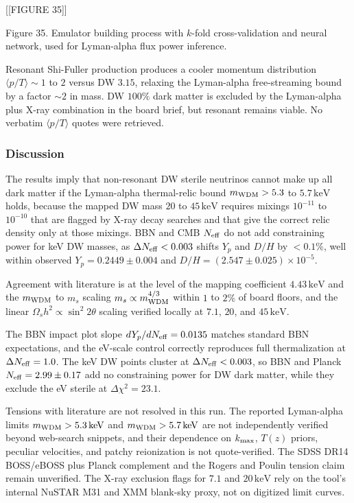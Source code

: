 \documentclass[11pt,a4paper]{article}
\begin{document}
[[FIGURE 35]]

Figure 35. Emulator building process with $k$-fold cross-validation and neural network, used for Lyman-alpha flux power inference.

Resonant Shi-Fuller production produces a cooler momentum distribution $\langle p/T \rangle \sim 1$ to $2$ versus DW $3.15$, relaxing the Lyman-alpha free-streaming bound by a factor $\sim 2$ in mass. DW $100\%$ dark matter is excluded by the Lyman-alpha plus X-ray combination in the board brief, but resonant remains viable. No verbatim $\langle p/T \rangle$ quotes were retrieved.

\subsubsection*{Discussion}
The results imply that non-resonant DW sterile neutrinos cannot make up all dark matter if the Lyman-alpha thermal-relic bound $m_{\rm WDM} > 5.3$ to $5.7\,\mathrm{keV}$ holds, because the mapped DW mass $20$ to $45\,\mathrm{keV}$ requires mixings $10^{-11}$ to $10^{-10}$ that are flagged by X-ray decay searches and that give the correct relic density only at those mixings. BBN and CMB $N_{\rm eff}$ do not add constraining power for keV DW masses, as $\Delta N_{\rm eff} < 0.003$ shifts $Y_p$ and $D/H$ by $<0.1\%$, well within observed $Y_p = 0.2449 \pm 0.004$ and $D/H = (2.547 \pm 0.025)\times10^{-5}$.

Agreement with literature is at the level of the mapping coefficient $4.43\,\mathrm{keV}$ and the $m_{\rm WDM}$ to $m_s$ scaling $m_s \propto m_{\rm WDM}^{4/3}$ within $1$ to $2\%$ of board floors, and the linear $\Omega_s h^2 \propto \sin^2 2\theta$ scaling verified locally at $7.1$, $20$, and $45\,\mathrm{keV}$.

The BBN impact plot slope $dY_p/dN_{\rm eff} = 0.0135$ matches standard BBN expectations, and the eV-scale control correctly reproduces full thermalization at $\Delta N_{\rm eff} = 1.0$. The keV DW points cluster at $\Delta N_{\rm eff} < 0.003$, so BBN and Planck $N_{\rm eff} = 2.99 \pm 0.17$ add no constraining power for DW dark matter, while they exclude the eV sterile at $\Delta\chi^2 = 23.1$.

Tensions with literature are not resolved in this run. The reported Lyman-alpha limits $m_{\rm WDM} > 5.3\,\mathrm{keV}$ and $m_{\rm WDM} > 5.7\,\mathrm{keV}$ are not independently verified beyond web-search snippets, and their dependence on $k_{\rm max}$, $T(z)$ priors, peculiar velocities, and patchy reionization is not quote-verified. The SDSS DR14 BOSS/eBOSS plus Planck complement and the Rogers and Poulin tension claim remain unverified. The X-ray exclusion flags for $7.1$ and $20\,\mathrm{keV}$ rely on the tool's internal NuSTAR M31 and XMM blank-sky proxy, not on digitized limit curves.
\end{document}
